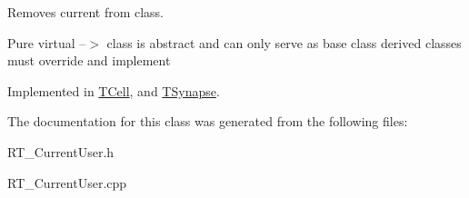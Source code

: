 Removes current from class. 

Pure virtual --$>$ class is abstract and can only serve as base class derived classes must override and implement 

Implemented in \hyperlink{class_t_cell_af0d4c09293bffc70c99f12de3500edc4}{T\+Cell}, and \hyperlink{class_t_synapse_a21516d391133b6be97c4a63320563f0a}{T\+Synapse}.



The documentation for this class was generated from the following files\+:\begin{DoxyCompactItemize}
\item 
R\+T\+\_\+\+Current\+User.\+h\item 
R\+T\+\_\+\+Current\+User.\+cpp\end{DoxyCompactItemize}
